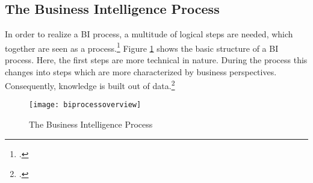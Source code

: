 \subsection{The Business Intelligence Process} \label{toc:prozess}

In order to realize a \ac{BI} process, a multitude of logical steps are needed, which together are seen as a process.\footcite[Cf.][p. 3]{foley2010business}
Figure \ref{figure:biprocessoverview} shows the basic structure of a \ac{BI} process.
Here, the first steps are more technical in nature. During the process this changes into steps
which are more characterized by business perspectives. Consequently, knowledge is
built out of data.\footcite[Cf.][p. 13]{kasemsap2016fundamentals}

\begin{figure}[H]
    \caption{The Business Intelligence Process}
    \texttt{[image: biprocessoverview]}
    \label{figure:biprocessoverview}
    \\
    \cite[Source: Based on][Fig. 2]{foley2010business}
\end{figure}

